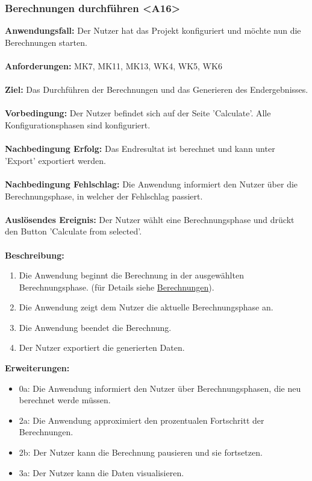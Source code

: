 \documentclass[parskip=full]{scrartcl} %
\begin{document}
\subsubsection*{Berechnungen durchführen <A16>}
\textbf{Anwendungsfall:} Der Nutzer hat das Projekt konfiguriert und möchte nun die Berechnungen starten.\\\\
\textbf{Anforderungen:} MK7, MK11, MK13, WK4, WK5, WK6\\\\
\textbf{Ziel:} Das Durchführen der Berechnungen und das Generieren des Endergebnisses.\\\\
\textbf{Vorbedingung:} Der Nutzer befindet sich auf der Seite 'Calculate'. Alle Konfigurationsphasen sind konfiguriert.\\\\
\textbf{Nachbedingung Erfolg:} Das Endresultat ist berechnet und kann unter 'Export' exportiert werden. \\\\
\textbf{Nachbedingung Fehlschlag:} Die Anwendung informiert den Nutzer über die Berechnungsphase, in welcher der Fehlschlag passiert. \\\\
\textbf{Auslösendes Ereignis:} Der Nutzer wählt eine Berechnungsphase und drückt den Button 'Calculate from selected'.\\\\
\textbf{Beschreibung:}
\begin{enumerate}
    \item Die Anwendung beginnt die Berechnung in der ausgewählten Berechnungsphase. (für Details siehe \hyperlink{calculations}{Berechnungen}).
    \item Die Anwendung zeigt dem Nutzer die aktuelle Berechnungsphase an.
    \item Die Anwendung beendet die Berechnung.
    \item Der Nutzer exportiert die generierten Daten.
\end{enumerate}
\textbf{Erweiterungen:} 
\begin{itemize}
    \item 0a: Die Anwendung informiert den Nutzer über Berechnungsphasen, die neu berechnet werde müssen.
    \item 2a: Die Anwendung approximiert den prozentualen Fortschritt der Berechnungen.
    \item 2b: Der Nutzer kann die Berechnung pausieren und sie fortsetzen.
    \item 3a: Der Nutzer kann die Daten visualisieren.
\end{itemize}
\newpage
\end{document}

